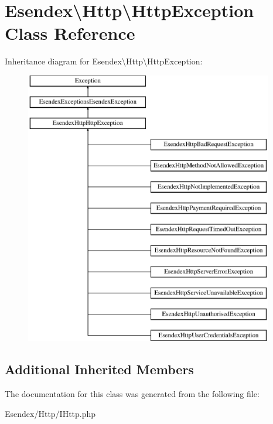 \section{Esendex\textbackslash{}Http\textbackslash{}Http\-Exception Class Reference}
\label{class_esendex_1_1_http_1_1_http_exception}
Inheritance diagram for Esendex\textbackslash{}Http\textbackslash{}Http\-Exception\-:\begin{figure}[H]
\begin{center}
\leavevmode
\includegraphics[height=12.000000cm]{class_esendex_1_1_http_1_1_http_exception}
\end{center}
\end{figure}
\subsection*{Additional Inherited Members}


The documentation for this class was generated from the following file\-:\begin{DoxyCompactItemize}
\item 
Esendex/\-Http/I\-Http.\-php\end{DoxyCompactItemize}
